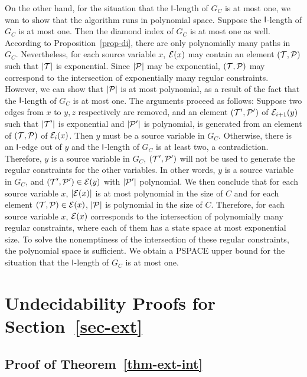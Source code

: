 On the other hand, for the situation that the $\mathsf{l}$-length of $G_C$ is at most one, we wan to show that the algorithm runs in polynomial space. Suppose the $\mathsf{l}$-length of $G_C$ is at most one. Then the diamond index of $G_C$ is at most one as well. According to Proposition~\ref{prop-di}, there are only polynomially many paths in $G_C$. Nevertheless, for each source variable $x$, $\mathcal{E}(x)$ may contain an element $(\mathcal{T},\mathcal{P})$ such that $|\mathcal{T}|$ is exponential. Since $|\mathcal{P}|$ may be exponential, $(\mathcal{T},\mathcal{P})$ may correspond to the intersection of exponentially many regular constraints. However, we can show that $|\mathcal{P}|$ is at most polynomial, as a result of the fact that the $\mathsf{l}$-length of $G_C$ is at most one. The arguments proceed as follows: Suppose two edges from $x$ to $y, z$ respectively are removed, and an element $(\mathcal{T}', \mathcal{P}')$ of $\mathcal{E}_{i+1}(y)$ such that $|\mathcal{T}'|$ is exponential and $|\mathcal{P}'|$ is polynomial, is generated from an element of $(\mathcal{T}, \mathcal{P})$ of $\mathcal{E}_i(x)$. Then $y$ must be a source variable in $G_C$. Otherwise, there is an $\mathsf{l}$-edge out of $y$ and the $\mathsf{l}$-length of $G_C$ is at least two, a contradiction. Therefore, $y$ is a source variable in $G_C$, $(\mathcal{T}', \mathcal{P}')$  will not be used to generate the regular constraints for the other variables. In other words, $y$ is a source variable in $G_C$, and $(\mathcal{T}', \mathcal{P}') \in \mathcal{E}(y)$ with $|\mathcal{P}'|$ polynomial. We then conclude that for each source variable $x$, $|\mathcal{E}(x)|$  is at most polynomial in the size of $C$ and for each element $(\mathcal{T}, \mathcal{P}) \in \mathcal{E}(x)$, $|\mathcal{P}|$ is polynomial in the size of $C$. Therefore, for each source variable $x$,  $\mathcal{E}(x)$ corresponds to the intersection of polynomially many regular constraints, where each of them has a state space at most exponential size. To solve the nonemptiness of the intersection of these regular constraints, the polynomial space is sufficient. We obtain a PSPACE upper bound for the situation that the $\mathsf{l}$-length of $G_C$ is at most one.


\def\refsecext{\ref{sec-ext}}
\section{Undecidability Proofs for Section~\protect\refsecext}
\label{sec:ext-undec-proofs}

\subsection{Proof of Theorem~\ref{thm-ext-int}}

